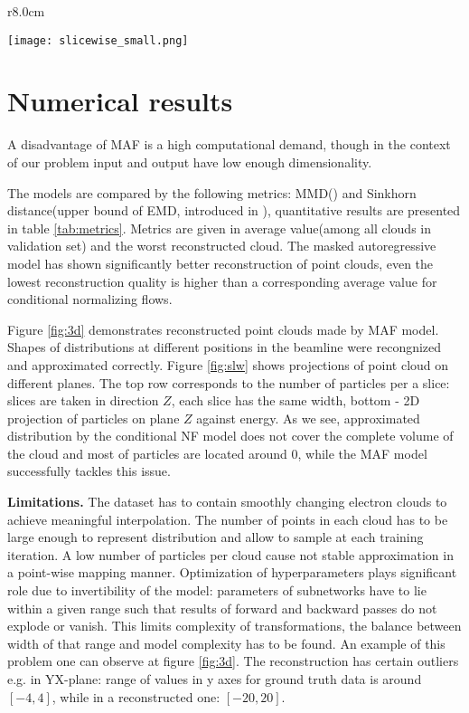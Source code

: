 \documentclass{article}
\begin{document}
\begin{wrapfigure}[11]{r}{8.0cm}
    \begin{center}
    \vspace*{-20mm}
    \texttt{[image: slicewise\_small.png]}
    \caption{Projections of an approximated point cloud: left column - conditional NFs, right column - MAF}
    \label{fig:slw}
    \end{center}
\end{wrapfigure}

\section{Numerical results} \label{sec:results}

A disadvantage of MAF is a high computational demand, though in the context of our problem input and output have low enough dimensionality.

The models are compared by the following metrics: MMD(\citet{mmd}) and Sinkhorn distance(upper bound of EMD, introduced in \citet{emd}), quantitative results are presented in table \ref{tab:metrics}. Metrics are given in average value(among all clouds in validation set) and the worst reconstructed cloud. 
The masked autoregressive model has shown significantly better reconstruction of point clouds, even the lowest reconstruction quality is higher than a corresponding average value for conditional normalizing flows. 

Figure \ref{fig:3d} demonstrates reconstructed point clouds made by MAF model. 
Shapes of distributions at different positions in the beamline were recongnized and approximated correctly.
Figure \ref{fig:slw} shows projections of point cloud on different planes. 
The top row corresponds to the number of particles per a slice: slices are taken in direction $Z$, each slice has the same width, bottom - 2D projection of particles on plane $Z$ against energy.
As we see, approximated distribution by the conditional NF model does not cover the complete volume of the cloud and most of particles are located around 0, while the MAF model successfully tackles this issue.

\textbf{Limitations.} The dataset has to contain smoothly changing electron clouds to achieve meaningful interpolation.
The number of points in each cloud has to be large enough to represent distribution and allow to sample at each training iteration. 
A low number of particles per cloud cause not stable approximation in a point-wise mapping manner. 
Optimization of hyperparameters plays significant role due to invertibility of the model: 
parameters of subnetworks have to lie within a given range such that results of forward and backward passes do not explode or vanish. 
This limits complexity of transformations, the balance between width of that range and model complexity has to be found. 
An example of this problem one can observe at figure \ref{fig:3d}. 
The reconstruction has certain outliers e.g. in YX-plane: range of values in y axes for ground truth data is around $[-4, 4]$, while in a reconstructed one: $[-20, 20]$. 
\end{document}
